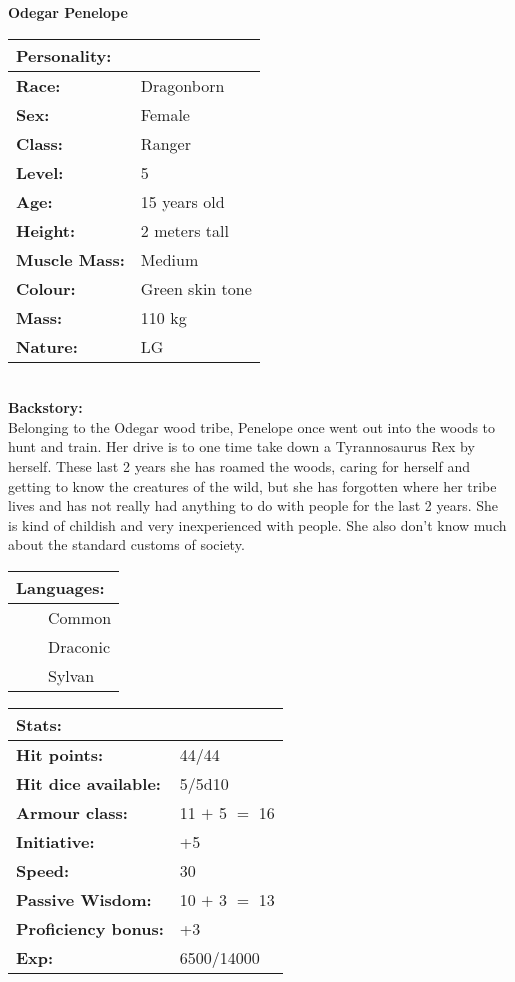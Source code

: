 \documentclass[11pt]{article}
\newcommand{\tabitem}{~~\llap{--}~~}
\begin{document}
	\begin{center}
\Huge \textbf{Odegar Penelope}
	\end{center}
	\begin{multicols}{2}
\noindent \begin{tabularx}{\linewidth}{@{}l l}
\Large \textbf{Personality:} 	& 						\\
\hline
\textbf{Race:} 					& Dragonborn 			\\
\textbf{Sex:} 					& Female 				\\
\textbf{Class:}					& Ranger				\\
\textbf{Level:} 				& 5						\\
\textbf{Age:} 					& 15 years old			\\
\textbf{Height:} 				& 2 meters tall 		\\
\textbf{Muscle Mass:} 			& Medium 				\\
\textbf{Colour:} 				& Green skin tone	 	\\
\textbf{Mass:} 					& 110 kg		 		\\
\textbf{Nature:} 				& LG
		\end{tabularx} \\
\textbf{Backstory:} \\
Belonging to the Odegar wood tribe, Penelope once went out into the woods to hunt and train. Her drive is to one time take down a Tyrannosaurus Rex by herself. These last 2 years she has roamed the woods, caring for herself and getting to know the creatures of the wild, but she has forgotten where her tribe lives and has not really had anything to do with people for the last 2 years. She is kind of childish and very inexperienced with people. She also don't know much about the standard customs of society.

\noindent \begin{tabularx}{\linewidth}{@{}l}
{\Large \textbf{Languages:}} \\
\hline
\tabitem Common \\
\tabitem Draconic \\
\tabitem Sylvan
		\end{tabularx}

\vspace{4mm}

\noindent \begin{tabularx}{\linewidth}{@{}l l}
\Large \textbf{Stats:}		 	& 									\\
\hline
\textbf{Hit points:} 			& 44/44					 			\\
\textbf{Hit dice available:}	& 5/5d10							\\
\textbf{Armour class:} 			& 11 $+$ 5 $=$ 16				 	\\
\textbf{Initiative:} 			& +5								\\
\textbf{Speed:} 				& 30		 						\\
\textbf{Passive Wisdom:} 		& 10 $+$ 3 $=$ 13 					\\
\textbf{Proficiency bonus:}		& +3								\\
\textbf{Exp:} 					& 6500/14000
		\end{tabularx}


\end{multicols}
\end{document}
